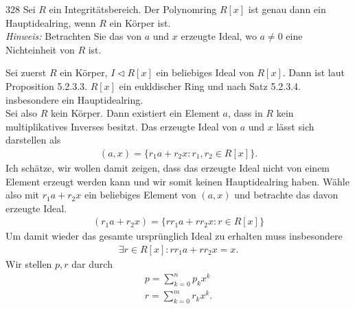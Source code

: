 \begin{algebraUE}{328}
Sei $R$ ein Integritätsbereich. Der Polynomring $R[x]$ ist genau dann ein
Hauptidealring, wenn $R$ ein Körper ist. \\
\textit{Hinweis:} Betrachten Sie das von $a$ und $x$ erzeugte Ideal, wo $a \neq 0$
eine Nichteinheit von $R$ ist.
\end{algebraUE}
\begin{solution}
Sei zuerst $R$ ein Körper, $I \vartriangleleft R[x]$ ein beliebiges Ideal von $R[x]$.
Dann ist laut Proposition 5.2.3.3. $R[x]$ ein eukldischer Ring und nach Satz 5.2.3.4.
insbesondere ein Hauptidealring. \\
Sei also $R$ kein Körper. Dann existiert ein Element $a$, dass in $R$ kein
multiplikatives Inverses besitzt. Das erzeugte Ideal von $a$ und $x$ lässt sich darstellen als
\begin{align*}
  (a,x) = \{r_1a + r_2x: r_1,r_2 \in R[x]\}.
\end{align*}
Ich schätze, wir wollen damit zeigen, dass das erzeugte Ideal nicht von einem
Element erzeugt werden kann und wir somit keinen Hauptidealring haben.
Wähle also mit $r_1a + r_2x$ ein beliebiges Element von $(a,x)$
und betrachte das davon erzeugte Ideal.
\begin{align*}
  (r_1a + r_2x) = \{rr_1a + rr_2x: r \in R[x]\}
\end{align*}
Um damit wieder das gesamte ursprünglich Ideal zu erhalten muss insbesondere
\begin{align*}
  \exists r \in R[x]: rr_1a + rr_2x = x.
\end{align*}
Wir stellen $p,r$ dar durch
\begin{align*}
  p = \sum_{k = 0}^n p_kx^k \\
  r = \sum_{k = 0}^m r_kx^k.
\end{align*}
\end{solution}
